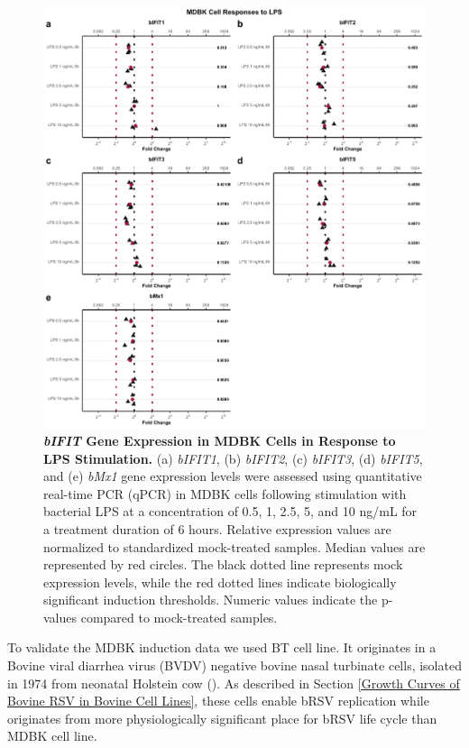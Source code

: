 \begin{figure}
    \centering
    \includegraphics[width=1\linewidth]{07. Chapter 2/Figs/02. Induction/02. mdbk_treat_lps.pdf}
    \caption[\textit{bIFIT} Gene Expression in MDBK Cells in Response to LPS Stimulation.]{\textbf{\textit{bIFIT} Gene Expression in MDBK Cells in Response to LPS Stimulation.} (a) \textit{bIFIT1}, (b) \textit{bIFIT2}, (c) \textit{bIFIT3}, (d) \textit{bIFIT5}, and (e) \textit{bMx1} gene expression levels were assessed using quantitative real-time PCR (qPCR) in MDBK cells following stimulation with bacterial LPS at a concentration of 0.5, 1, 2.5, 5, and 10 ng/mL for a treatment duration of 6 hours. Relative expression values are normalized to standardized mock-treated samples. Median values are represented by red circles. The black dotted line represents mock expression levels, while the red dotted lines indicate biologically significant induction thresholds. Numeric values indicate the p-values compared to mock-treated samples.}
    \label{fig:MDBK responses to LPS}
\end{figure}

To validate the MDBK induction data we used BT cell line. It originates in a Bovine viral diarrhea virus (BVDV) negative bovine nasal turbinate cells, isolated in 1974 from neonatal Holstein cow (\cite{McClurkin1974ComparisonVirus}). As described in Section \ref{Growth Curves of Bovine RSV in Bovine Cell Lines}, these cells enable bRSV replication while originates from more physiologically significant place for bRSV life cycle than MDBK cell line. 




